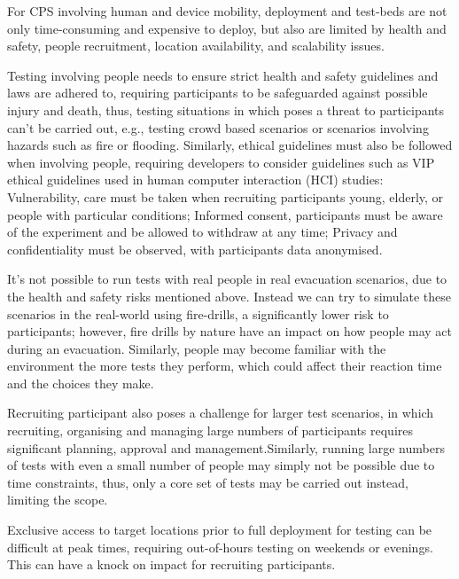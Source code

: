 For CPS involving human and device mobility, deployment and test-beds\cite{wisebed1,wisebed2,TempLab,dependibilityTestbedChallenge} are not only time-consuming and expensive to deploy, but also are limited by health and safety, people recruitment, location availability, and scalability issues.

Testing involving people needs to ensure strict health and safety guidelines and laws are adhered to, requiring participants to be safeguarded against possible injury and death, thus, testing situations in which poses a threat to participants can't be carried out, e.g., testing crowd based scenarios or scenarios involving hazards such as fire or flooding. Similarly, ethical guidelines must also be followed when involving people, requiring developers to consider guidelines such as VIP ethical guidelines used in human computer interaction (HCI) studies\cite{blandford2008_controlled_experiments,blandford_pretareporter}: Vulnerability, care must be taken when recruiting participants young, elderly, or people with particular conditions; Informed consent, participants must be aware of the experiment and be allowed to withdraw at any time; Privacy and confidentiality must be observed, with participants data anonymised.

It's not possible to run tests with real people in real evacuation scenarios, due to the health and safety risks mentioned above. Instead we can try to simulate these scenarios in the real-world using fire-drills, a significantly lower risk to participants; however, fire drills by nature have an impact on how people may act during an evacuation. Similarly, people may become familiar with the environment the more tests they perform, which could affect their reaction time and the choices they make. 

Recruiting participant also poses a challenge for larger test scenarios, in which recruiting, organising and managing large numbers of participants requires significant planning, approval and management.Similarly, running large numbers of tests with even a small number of people may simply not be possible due to time constraints, thus, only a core set of tests may be carried out instead, limiting the scope.

Exclusive access to target locations prior to full deployment for testing can be difficult at peak times, requiring out-of-hours testing on weekends or evenings. This can have a knock on impact for recruiting participants.


